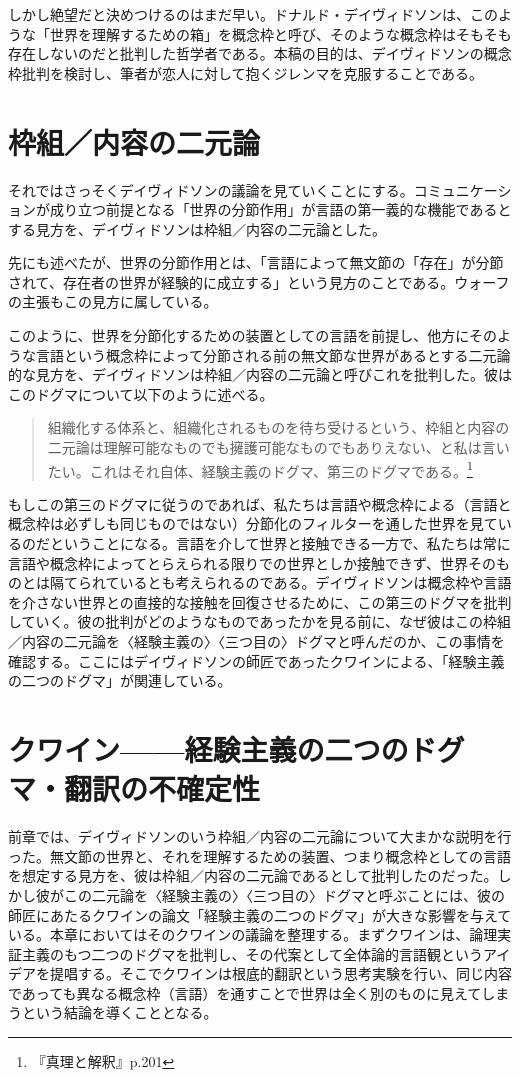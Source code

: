 \documentclass[b5j,twoside,twocolumn]{utarticle}
\begin{document}
しかし絶望だと決めつけるのはまだ早い。ドナルド・デイヴィドソンは、このような「世界を理解するための箱」を概念枠と呼び、そのような概念枠はそもそも存在しないのだと批判した哲学者である。本稿の目的は、デイヴィドソンの概念枠批判を検討し、筆者が恋人に対して抱くジレンマを克服することである。

\section{枠組／内容の二元論}
それではさっそくデイヴィドソンの議論を見ていくことにする。コミュニケーションが成り立つ前提となる「世界の分節作用」が言語の第一義的な機能であるとする見方を、デイヴィドソンは枠組／内容の二元論とした。


先にも述べたが、世界の分節作用とは、「言語によって無文節の「存在」が分節されて、存在者の世界が経験的に成立する」という見方のことである。ウォーフの主張もこの見方に属している。


このように、世界を分節化するための装置としての言語を前提し、他方にそのような言語という概念枠によって分節される前の無文節な世界があるとする二元論的な見方を、デイヴィドソンは枠組／内容の二元論と呼びこれを批判した。彼はこのドグマについて以下のように述べる。
\begin{quote}
組織化する体系と、組織化されるものを待ち受けるという、枠組と内容の二元論は理解可能なものでも擁護可能なものでもありえない、と私は言いたい。これはそれ自体、経験主義のドグマ、第三のドグマである。\footnote{ 『真理と解釈』p.201}
\end{quote}


もしこの第三のドグマに従うのであれば、私たちは言語や概念枠による（言語と概念枠は必ずしも同じものではない）分節化のフィルターを通した世界を見ているのだということになる。言語を介して世界と接触できる一方で、私たちは常に言語や概念枠によってとらえられる限りでの世界としか接触できず、世界そのものとは隔てられているとも考えられるのである。デイヴィドソンは概念枠や言語を介さない世界との直接的な接触を回復させるために、この第三のドグマを批判していく。彼の批判がどのようなものであったかを見る前に、なぜ彼はこの枠組／内容の二元論を〈経験主義の〉〈三つ目の〉ドグマと呼んだのか、この事情を確認する。ここにはデイヴィドソンの師匠であったクワインによる、「経験主義の二つのドグマ」が関連している。


\section{\tbaselineshift =4.0pt クワイン------経験主義の二つのドグマ・翻訳の不確定性}
前章では、デイヴィドソンのいう枠組／内容の二元論について大まかな説明を行った。無文節の世界と、それを理解するための装置、つまり概念枠としての言語を想定する見方を、彼は枠組／内容の二元論であるとして批判したのだった。しかし彼がこの二元論を〈経験主義の〉〈三つ目の〉ドグマと呼ぶことには、彼の師匠にあたるクワインの論文「経験主義の二つのドグマ」が大きな影響を与えている。本章においてはそのクワインの議論を整理する。まずクワインは、論理実証主義のもつ二つのドグマを批判し、その代案として全体論的言語観というアイデアを提唱する。そこでクワインは根底的翻訳という思考実験を行い、同じ内容であっても異なる概念枠（言語）を通すことで世界は全く別のものに見えてしまうという結論を導くこととなる。
\end{document}
